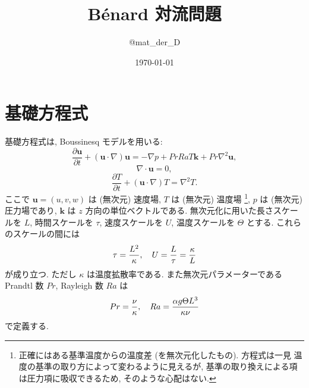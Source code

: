 \documentclass[12pt,a4j]{jsarticle}
\title{B\'{e}nard 対流問題}
\author{@mat\_der\_D}
\date{\today}
\newcommand{\p}{\partial}
\begin{document}
\maketitle


\section{基礎方程式}

基礎方程式は, Boussinesq モデルを用いる:
\begin{equation}
 \dfrac{\p \bm{u}}{\p t}
  + (\bm{u} \cdot \nabla) \bm{u}
  = - \nabla p + Pr Ra T \bm{k}
    + Pr \nabla^{2} \bm{u},
\end{equation}
\begin{equation}
 \nabla \cdot \bm{u} = 0,
\end{equation}
\begin{equation}
 \dfrac{\p T}{\p t} 
  + (\bm{u} \cdot \nabla) T
  = \nabla^{2} T.
\end{equation}
ここで $\bm{u} = (u, v, w)$ は (無次元) 速度場,
$T$ は (無次元) 温度場
\footnote{正確にはある基準温度からの温度差
(を無次元化したもの). 方程式は一見
温度の基準の取り方によって変わるように見えるが,
基準の取り換えによる項は圧力項に吸収できるため,
そのような心配はない.},
$p$ は (無次元) 圧力場であり,
$\bm{k}$ は $z$ 方向の単位ベクトルである.
無次元化に用いた長さスケールを $L$,
時間スケールを $\tau$, 速度スケールを $U$,
温度スケールを $\Theta$ とする.
これらのスケールの間には
\begin{equation}
  \tau = \dfrac{L^2}{\kappa}, \quad
  U    = \dfrac{L}{\tau} = \dfrac{\kappa}{L}
  \notag
\end{equation}
が成り立つ. ただし $\kappa$ は温度拡散率である.
また無次元パラメーターである
Prandtl 数 $Pr$, Rayleigh 数 $Ra$ は
\begin{equation}
 Pr = \dfrac{\nu}{\kappa}, \quad
 Ra = \dfrac{\alpha g \Theta L^{3}}{\kappa \nu}
 \notag
\end{equation}
で定義する. \par
\end{document}
